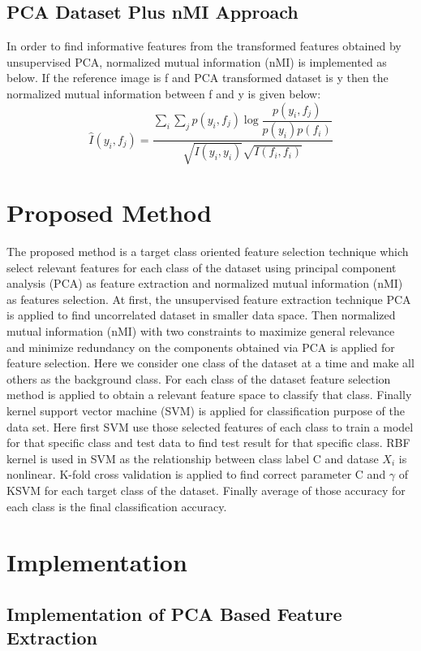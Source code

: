 \documentclass[document.tex]{subfiles}
\begin{document}
\subsection{PCA Dataset Plus nMI Approach}
\noindent In order to find informative features from the transformed features
obtained by unsupervised PCA, normalized mutual information (nMI) is implemented as below. If the reference image is f and PCA transformed dataset is y then the normalized mutual information between f and y is given below:
\begin{equation}
\hat{I}(y_i,f_j) = \dfrac{\sum_{i}\sum_{j} p(y_i,f_j)\log\dfrac{p(y_i,f_j)}{p(y_i)p(f_i)}}{\sqrt{I(y_i,y_i)}\sqrt{I(f_i,f_i)}}
\end{equation}  
\section{Proposed Method}
\noindent The proposed method is a target class oriented feature selection technique which select relevant features for each class of the dataset using principal component analysis (PCA) as feature extraction and normalized mutual information (nMI) as features selection. At first, the unsupervised feature extraction technique PCA is applied to find uncorrelated dataset in smaller data space. Then normalized mutual information (nMI) with two constraints to maximize general relevance and minimize redundancy on the components obtained via PCA is applied for feature selection. Here we consider one class of the dataset at a time and make all others as the background class. For each class of the dataset feature selection method is applied to obtain a relevant feature space to classify that class. Finally kernel support vector machine (SVM) is applied for classification purpose of the data set. Here first SVM use those selected features of each class to train a model for that specific class and test data to find test result for that specific class. RBF kernel is used in SVM as the relationship between class label C and datase $X_i$ is nonlinear. K-fold cross validation is applied to find correct parameter C and $\gamma$ of KSVM for each target class of the dataset. Finally average of those accuracy for each class is the final classification accuracy.
\section{Implementation}

\subsection{Implementation of PCA Based Feature Extraction}
\end{document}
